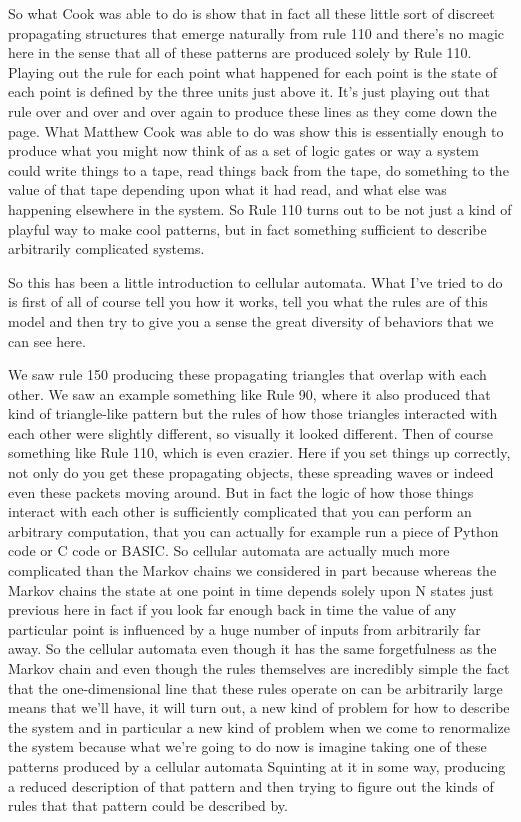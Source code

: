 \documentclass[]{article}
\begin{document}
So what Cook was able to do is show that in fact all these little sort of discreet propagating structures that emerge naturally from rule 110 and there's no magic here in the sense that all of these patterns are produced solely by Rule 110.
Playing out the rule for each point what happened for each point is the state of each point is defined by the three units just above it.
It's just playing out that rule over and over and over again to produce these lines as they come down the page. What Matthew Cook was able to do was show this is essentially enough to produce what you might now think of as a set of logic gates or way a system could write things to a tape, read things back from the tape, do something to the value of that tape depending upon what it had read, and what else was happening elsewhere in the system.
So Rule 110 turns out to be not just a kind of playful way to make cool patterns,
but in fact something sufficient to describe arbitrarily complicated systems.

So this has been a little introduction to cellular automata. What I've tried to do is first of all of course tell you how it works, tell you what the rules are of this model and then try to give you a sense the great diversity of behaviors that we can see here.

We saw rule 150 producing these propagating triangles that overlap with each other.
We saw an example something like Rule 90, where it also produced that kind of triangle-like pattern but the rules of how those triangles interacted with each other
were slightly different, so visually it looked different.
Then of course something like Rule 110, which is even crazier. Here if you set things up correctly, not only do you get these propagating objects, these spreading waves or indeed even these packets moving around.
But in fact the logic of how those things interact with each other is sufficiently complicated that you can perform an arbitrary computation,
that you can actually for example run
a piece of Python code or C code or BASIC.
So cellular automata are actually much more
complicated than the Markov chains we considered
in part because whereas the Markov chains
the state at one point in time
depends solely upon N states just previous
here in fact if you look far enough back in time
the value of any particular point
is influenced by a huge number
of inputs from arbitrarily far away.
So the cellular automata even
though it has the same forgetfulness
as the Markov chain
and even though the rules
themselves are incredibly simple
the fact that the one-dimensional line that these rules operate on can be arbitrarily large means that we'll have, it will turn out, a new kind of problem for how to describe the system and in particular a new kind of problem when we come to renormalize the system because what we're going to do now is imagine taking one of these patterns produced by a cellular automata
Squinting at it in some way, producing a reduced description of that pattern and then trying to figure out the kinds of rules that that pattern could be described by.
\end{document}

